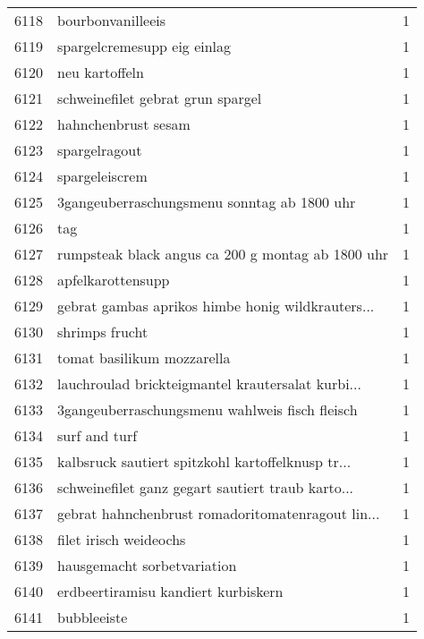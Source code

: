 \begin{tabular}{llr}
6118 &                                  bourbonvanilleeis &      1 \\
6119 &                        spargelcremesupp eig einlag &      1 \\
6120 &                                     neu kartoffeln &      1 \\
6121 &                  schweinefilet gebrat grun spargel &      1 \\
6122 &                                hahnchenbrust sesam &      1 \\
6123 &                                      spargelragout &      1 \\
6124 &                                     spargeleiscrem &      1 \\
6125 &        3gangeuberraschungsmenu sonntag ab 1800 uhr &      1 \\
6126 &                                                tag &      1 \\
6127 &  rumpsteak black angus ca 200 g montag ab 1800 uhr &      1 \\
6128 &                                  apfelkarottensupp &      1 \\
6129 &  gebrat gambas aprikos himbe honig wildkrauters... &      1 \\
6130 &                                     shrimps frucht &      1 \\
6131 &                         tomat basilikum mozzarella &      1 \\
6132 &  lauchroulad brickteigmantel krautersalat kurbi... &      1 \\
6133 &     3gangeuberraschungsmenu wahlweis fisch fleisch &      1 \\
6134 &                                      surf and turf &      1 \\
6135 &  kalbsruck sautiert spitzkohl kartoffelknusp tr... &      1 \\
6136 &  schweinefilet ganz gegart sautiert traub karto... &      1 \\
6137 &  gebrat hahnchenbrust romadoritomatenragout lin... &      1 \\
6138 &                             filet irisch weideochs &      1 \\
6139 &                        hausgemacht sorbetvariation &      1 \\
6140 &                erdbeertiramisu kandiert kurbiskern &      1 \\
6141 &                                        bubbleeiste &      1 \\

\end{tabular}

